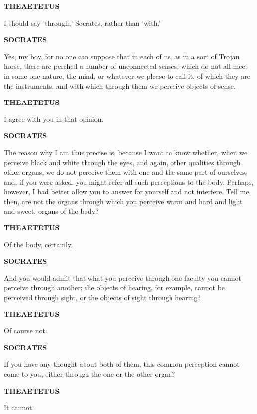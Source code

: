 \documentclass[11pt,letter]{article}
\begin{document}
\par \textbf{THEAETETUS}
\par   I should say 'through,' Socrates, rather than 'with.'

\par \textbf{SOCRATES}
\par   Yes, my boy, for no one can suppose that in each of us, as in a sort of Trojan horse, there are perched a number of unconnected senses, which do not all meet in some one nature, the mind, or whatever we please to call it, of which they are the instruments, and with which through them we perceive objects of sense.

\par \textbf{THEAETETUS}
\par   I agree with you in that opinion.

\par \textbf{SOCRATES}
\par   The reason why I am thus precise is, because I want to know whether, when we perceive black and white through the eyes, and again, other qualities through other organs, we do not perceive them with one and the same part of ourselves, and, if you were asked, you might refer all such perceptions to the body. Perhaps, however, I had better allow you to answer for yourself and not interfere. Tell me, then, are not the organs through which you perceive warm and hard and light and sweet, organs of the body?

\par \textbf{THEAETETUS}
\par   Of the body, certainly.

\par \textbf{SOCRATES}
\par   And you would admit that what you perceive through one faculty you cannot perceive through another; the objects of hearing, for example, cannot be perceived through sight, or the objects of sight through hearing?

\par \textbf{THEAETETUS}
\par   Of course not.

\par \textbf{SOCRATES}
\par   If you have any thought about both of them, this common perception cannot come to you, either through the one or the other organ?

\par \textbf{THEAETETUS}
\par   It cannot.
\end{document}

